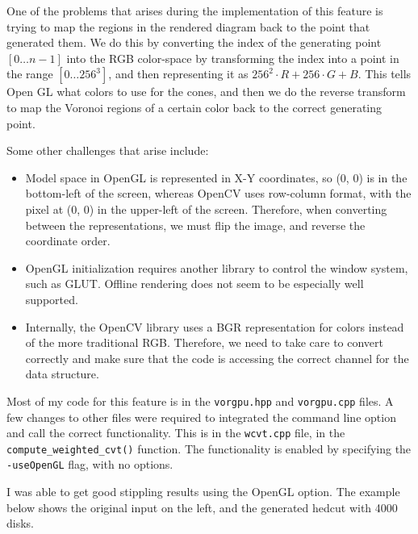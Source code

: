 \documentclass[11pt]{article}
\begin{document}
One of the problems that arises during the implementation of this feature is trying to map the regions in the rendered diagram back to the point that generated them. We do this by converting the index of the generating point $[0 \dots n - 1]$ into the RGB color-space by transforming the index into a point in the range $[0 \dots 256^3]$, and then representing it as $256^2 \cdot R + 256 \cdot G + B$. This tells Open GL what colors to use for the cones, and then we do the reverse transform to map the Voronoi regions of a certain color back to the correct generating point.

Some other challenges that arise include:
\begin{itemize}
	\item Model space in OpenGL is represented in X-Y coordinates, so (0, 0) is in the bottom-left of the screen, whereas OpenCV uses row-column format, with the pixel at (0, 0) in the upper-left of the screen. Therefore, when converting between the representations, we must flip the image, and reverse the coordinate order.
	\item OpenGL initialization requires another library to control the window system, such as GLUT. Offline rendering does not seem to be especially well supported.
	\item Internally, the OpenCV library uses a BGR representation for colors instead of the more traditional RGB. Therefore, we need to take care to convert correctly and make sure that the code is accessing the correct channel for the data structure.
\end{itemize} 

Most of my code for this feature is in the \verb|vorgpu.hpp| and \verb|vorgpu.cpp| files. A few changes to other files were required to integrated the command line option and call the correct functionality. This is in the \verb|wcvt.cpp| file, in the \verb|compute_weighted_cvt()| function. The functionality is enabled by specifying the \verb|-useOpenGL| flag, with no options.

I was able to get good stippling results using the OpenGL option. The example below shows the original input on the left, and the generated hedcut with 4000 disks.
\end{document}

